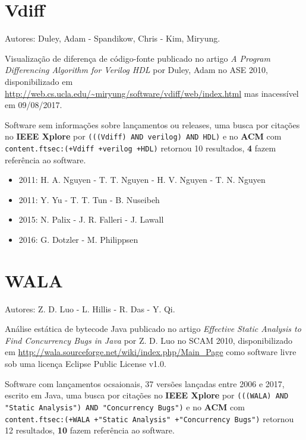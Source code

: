 \section{Vdiff}

Autores:
Duley, Adam - Spandikow, Chris - Kim, Miryung.

Visualização de diferença de código-fonte
publicado no artigo {\it A Program Differencing Algorithm for Verilog HDL}
por Duley, Adam
no ASE 2010,
disponibilizado em \url{http://web.cs.ucla.edu/~miryung/software/vdiff/web/index.html}
mas inacessível em 09/08/2017.

Software sem informações sobre lançamentos ou releases,
uma busca por citações no {\bf IEEE Xplore} por
\texttt{(((Vdiff) AND verilog) AND HDL)}
e no {\bf ACM} com
\texttt{content.ftsec:(+Vdiff +verilog +HDL)}
retornou
10 resultados,
{\bf 4} fazem referência ao software.

\begin{itemize}
\item 2011: H. A. Nguyen - T. T. Nguyen - H. V. Nguyen - T. N. Nguyen
\item 2011: Y. Yu - T. T. Tun - B. Nuseibeh
\item 2015: N. Palix - J. R. Falleri - J. Lawall
\item 2016: G. Dotzler - M. Philippsen
\end{itemize}

\section{WALA}

Autores:
Z. D. Luo - L. Hillis - R. Das - Y. Qi.

Análise estática de bytecode Java
publicado no artigo {\it Effective Static Analysis to Find Concurrency Bugs in Java}
por Z. D. Luo
no SCAM 2010,
disponibilizado em \url{http://wala.sourceforge.net/wiki/index.php/Main_Page}
como software livre
sob uma licença Eclipse Public License v1.0.

Software com lançamentos ocsaionais,
37 versões lançadas
entre 2006 e 2017,
escrito em Java,
uma busca por citações no {\bf IEEE Xplore} por
\texttt{(((WALA) AND "Static Analysis") AND "Concurrency Bugs")}
e no {\bf ACM} com
\texttt{content.ftsec:(+WALA +"Static Analysis" +"Concurrency Bugs")}
retornou
12 resultados,
{\bf 10} fazem referência ao software.

